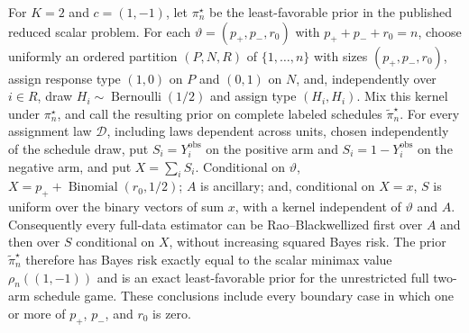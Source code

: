 For \(K=2\) and \(c=(1,-1)\), let \(\pi_n^\star\) be the least-favorable prior in the published reduced scalar problem. For each \(\vartheta=(p_+,p_-,r_0)\) with \(p_++p_-+r_0=n\), choose uniformly an ordered partition \((P,N,R)\) of \(\{1,\ldots,n\}\) with sizes \((p_+,p_-,r_0)\), assign response type \((1,0)\) on \(P\) and \((0,1)\) on \(N\), and, independently over \(i\in R\), draw \(H_i\sim\operatorname{Bernoulli}(1/2)\) and assign type \((H_i,H_i)\). Mix this kernel under \(\pi_n^\star\), and call the resulting prior on complete labeled schedules \(\widetilde\pi_n^\star\). For every assignment law \(\mathcal D\), including laws dependent across units, chosen independently of the schedule draw, put \(S_i=Y_i^{\mathrm{obs}}\) on the positive arm and \(S_i=1-Y_i^{\mathrm{obs}}\) on the negative arm, and put \(X=\sum_iS_i\). Conditional on \(\vartheta\), \(X=p_++\operatorname{Binomial}(r_0,1/2)\); \(A\) is ancillary; and, conditional on \(X=x\), \(S\) is uniform over the binary vectors of sum \(x\), with a kernel independent of \(\vartheta\) and \(A\). Consequently every full-data estimator can be Rao--Blackwellized first over \(A\) and then over \(S\) conditional on \(X\), without increasing squared Bayes risk. The prior \(\widetilde\pi_n^\star\) therefore has Bayes risk exactly equal to the scalar minimax value \(\rho_n((1,-1))\) and is an exact least-favorable prior for the unrestricted full two-arm schedule game. These conclusions include every boundary case in which one or more of \(p_+\), \(p_-\), and \(r_0\) is zero.